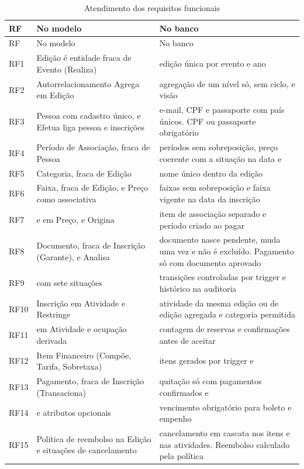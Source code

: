 \begin{longtable}{@{}l L{6.2cm} L{6.6cm}@{}}
\caption{Atendimento dos requisitos funcionais}\label{tab:rf}\\
\toprule
RF & No modelo & No banco\\
\midrule
\endfirsthead
\toprule
RF & No modelo & No banco\\
\midrule
\endhead
\bottomrule
\endfoot
RF1 & Edição é entidade fraca de Evento (Realiza) & edição única por evento e ano\\
RF2 & Autorrelacionamento Agrega em Edição & agregação de um nível só, sem ciclo, e visão \\
RF3 & Pessoa com cadastro único, e Efetua liga pessoa e inscrições & e-mail, CPF e passaporte com país únicos. CPF ou passaporte obrigatório\\
RF4 & Período de Associação, fraca de Pessoa & períodos sem sobreposição, preço coerente com a situação na data e \\
RF5 & Categoria, fraca de Edição & nome único dentro da edição\\
RF6 & Faixa, fraca de Edição, e Preço como associativa & faixas sem sobreposição e faixa vigente na data da inscrição\\
RF7 &  e  em Preço, e Origina & item de associação separado e período criado ao pagar\\
RF8 & Documento, fraca de Inscrição (Garante), e Analisa & documento nasce pendente, muda uma vez e não é excluído. Pagamento só com documento aprovado\\
RF9 &  com sete situações & transições controladas por trigger e histórico na auditoria\\
RF10 & Inscrição em Atividade e Restringe & atividade da mesma edição ou de edição agregada e categoria permitida\\
RF11 &  em Atividade e ocupação derivada & contagem de reservas e confirmações antes de aceitar\\
RF12 & Item Financeiro (Compõe, Tarifa, Sobretaxa) & itens gerados por trigger e \\
RF13 & Pagamento, fraca de Inscrição (Transaciona) & quitação só com pagamentos confirmados e \\
RF14 &  e atributos opcionais & vencimento obrigatório para boleto e empenho\\
RF15 & Política de reembolso na Edição e situações de cancelamento & cancelamento em cascata nos itens e nas atividades. Reembolso calculado pela política\\

\end{longtable}
